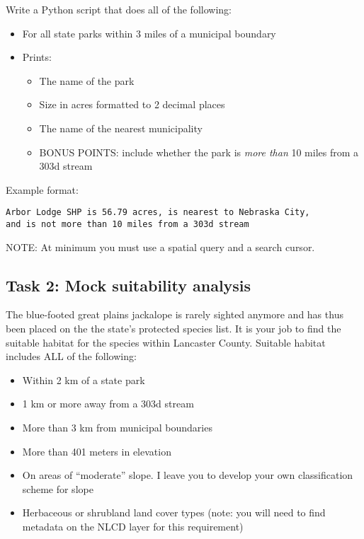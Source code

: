 \documentclass[]{article}
\providecommand{\tightlist}{%
  \setlength{\itemsep}{0pt}\setlength{\parskip}{0pt}}
\begin{document}
Write a Python script that does all of the following:

\begin{itemize}
\tightlist
\item
  For all state parks within 3 miles of a municipal boundary
\item
  Prints:

  \begin{itemize}
  \tightlist
  \item
    The name of the park
  \item
    Size in acres formatted to 2 decimal places
  \item
    The name of the nearest municipality
  \item
    BONUS POINTS: include whether the park is \emph{more than} 10 miles
    from a 303d stream
  \end{itemize}
\end{itemize}

Example format:

\begin{verbatim}
Arbor Lodge SHP is 56.79 acres, is nearest to Nebraska City, 
and is not more than 10 miles from a 303d stream
\end{verbatim}

NOTE: At minimum you must use a spatial query and a search cursor.

\hypertarget{task-2-mock-suitability-analysis}{%
\subsection{Task 2: Mock suitability
analysis}\label{task-2-mock-suitability-analysis}}

The blue-footed great plains jackalope is rarely sighted anymore and has
thus been placed on the the state's protected species list. It is your
job to find the suitable habitat for the species within Lancaster
County. Suitable habitat includes ALL of the following:

\begin{itemize}
\tightlist
\item
  Within 2 km of a state park
\item
  1 km or more away from a 303d stream
\item
  More than 3 km from municipal boundaries
\item
  More than 401 meters in elevation
\item
  On areas of ``moderate'' slope. I leave you to develop your own
  classification scheme for slope
\item
  Herbaceous or shrubland land cover types (note: you will need to find
  metadata on the NLCD layer for this requirement)
\end{itemize}
\end{document}
